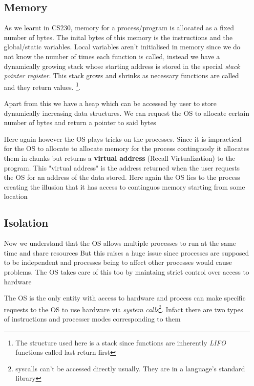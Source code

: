 \documentclass[12pt]{article}
\newcommand{\tbox}[1]{\noindent\fbox{\parbox{\textwidth}{#1}}}
\begin{document}
\subsection{Memory}
As we learnt in CS230, memory for a process/program is allocated as a fixed number of bytes. The inital bytes
of this memory is the instructions and the global/static variables. Local variables aren't initialised in memory since
we do not know the number of times each function is called, instead we have a dynamically growing stack whose starting address is
stored in the special \textit{stack pointer register}. This stack grows and shrinks as necessary functions are called and they return values.
\footnote{The structure used here is a stack since functions are inherently \textit{LIFO} functions called last return first}.


Apart from this we have a heap which can be accessed by user to store dynamically increasing data structures. We can request the
OS to allocate certain number of bytes and return a pointer to said bytes


Here again however the OS plays tricks on the processes. Since it is impractical for the OS to allocate to 
allocate memory for the process continguosly it allocates them in chunks but returns a \textbf{virtual address} (Recall Virtualization) to the program. This "virtual address" is the
address returned when the user requests the OS for an address of the data stored. Here again the OS lies to the process creating the illusion that it has access to continguos memory starting
from some location

\noindent\tbox{
    \begin{center}
    \textbf{\Huge Lecture 2}
    \end{center}
}
\subsection{Isolation}
    \label{section:Isolation}
    Now we understand that the OS allows multiple processes to run at the same time and share resources
    But this raises a huge issue since processes are supposed to be independent and processes being to affect other 
    processes would cause problems. The OS takes care of this too by maintaing strict control over access to hardware

    The OS is the only entity with access to hardware and process can make specific requests to the OS to use hardware
    via \textit{system calls}\footnote{syscalls can't be accessed directly usually. They are in a language's standard library}. Infact there are two types of instructions and processer modes corresponding to them
\end{document}
